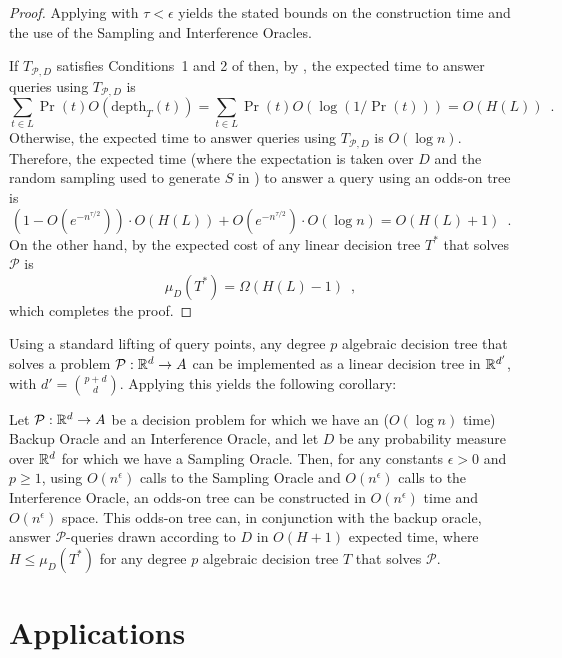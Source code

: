\documentclass{patmorin}
\newcommand{\depth}{\mathrm{depth}}
\begin{document}
\begin{proof}
  Applying  with $\tau < \epsilon$
  yields the stated bounds on the construction time and the use of the
  Sampling and Interference Oracles.

  If $T_{\mathcal{P},D}$ satisfies Conditions~1 and 2 of
   then, by , the expected
  time to answer queries using $T_{\mathcal{P},D}$ is
  \[
     \sum_{t\in L} \Pr(t)O(\depth_T(t)) 
          = \sum_{t\in L}\Pr(t)O(\log(1/\Pr(t))) = O(H(L)) \enspace .
  \]
  Otherwise, the expected time to answer queries using $T_{\mathcal{P},D}$
  is $O(\log n)$.  Therefore, the expected time (where the expectation
  is taken over $D$ and the random sampling used to generate $S$ in
  ) to answer a query using an odds-on tree is
  \[
     (1-O(e^{-n^{\tau/2}}))\cdot O(H(L)) + O(e^{-n^{\tau/2}})\cdot O(\log n) =
        O(H(L)+1)  \enspace .
  \]
  On the other hand, by  the expected cost of any
  linear decision tree $T^*$ that solves $\mathcal{P}$ is
  \[
      \mu_D(T^*) = \Omega(H(L) - 1) \enspace ,
  \]
  which completes the proof.
\end{proof}

Using a standard lifting of query points, any degree $p$ algebraic
decision tree that solves a problem $\mathcal{P}:\mathbb{R}^d\rightarrow A$
can be implemented as a linear decision tree in $\mathbb{R}^{d'}$, with
$d'={p+d\choose d}$.  Applying this yields the following corollary:

\begin{cor}
  Let $\mathcal{P}:\mathbb{R}^d\rightarrow A$ be a decision problem for which
  we have an ($O(\log n)$ time) Backup Oracle and an Interference
  Oracle, and let $D$ be any probability measure over $\mathbb{R}^d$ for which
  we have a Sampling Oracle.  Then, for any constants $\epsilon > 0$
  and $p\ge 1$, using $O(n^\epsilon)$ calls to the Sampling Oracle and
  $O(n^\epsilon)$ calls to the Interference Oracle, an odds-on tree
  can be constructed in $O(n^\epsilon)$ time and $O(n^\epsilon)$ space.
  This odds-on tree can, in conjunction with the backup oracle, answer
  $\mathcal{P}$-queries drawn according to $D$ in $O(H+1)$ expected time,
  where $H \le \mu_D(T^*)$ for any degree $p$ algebraic decision tree $T$
  that solves $\mathcal{P}$.
\end{cor}

\section{Applications}
\end{document}
